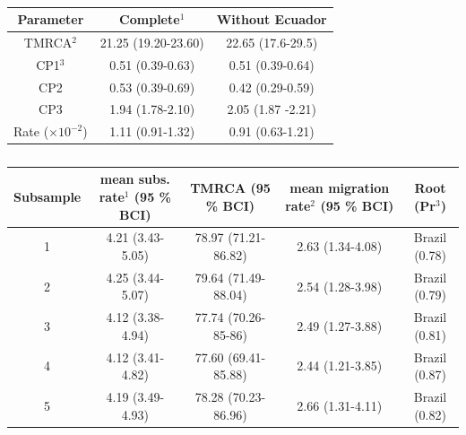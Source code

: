 \documentclass[a4paper,10pt]{article}
\begin{document}
\begin{center}
\begin{table}[h]
\caption{}
\begin{tabular}{ccc}
\toprule
Parameter	&Complete$^{1}$	&Without Ecuador\\
\midrule
TMRCA$^{2}$	&21.25 (19.20-23.60)	&22.65 (17.6-29.5)\\
CP1$^{3}$	&0.51 (0.39-0.63)	&0.51 (0.39-0.64)\\
CP2	&0.53 (0.39-0.69)	&0.42 (0.29-0.59)\\
CP3	&1.94 (1.78-2.10)	& 2.05 (1.87 -2.21)\\
Rate ($\times 10^{-2}$)	&1.11 (0.91-1.32)	&0.91 (0.63-1.21)\\
\bottomrule
\end{tabular}
\label{tab:SB_O}
 \end{table}
\end{center}

\newpage
\begin{table}
\medskip
\begin{minipage}{\textwidth} 
\begin{center}
\caption{}
\begin{tabular}{ccccc}
\toprule
Subsample	&mean subs. rate$^{1}$ (95 \% BCI)	&TMRCA (95 \% BCI)	&mean migration rate$^{2}$  (95 \% BCI)	&Root (Pr$^{3}$)\\
\midrule
1	&4.21 (3.43-5.05)	&78.97 (71.21-86.82)	&2.63 (1.34-4.08)	&Brazil (0.78)\\
2	&4.25 (3.44-5.07)	&79.64 (71.49-88.04)	&2.54 (1.28-3.98)	&Brazil (0.79)\\
3	&4.12 (3.38-4.94)	&77.74 (70.26-85-86)	&2.49 (1.27-3.88)	&Brazil (0.81)\\
4	&4.12 (3.41-4.82)	&77.60 (69.41-85.88)	&2.44 (1.21-3.85)	&Brazil (0.87)\\
5	&4.19 (3.49-4.93)	&78.28 (70.23-86.96)	&2.66 (1.31-4.11)	&Brazil (0.82)\\
\bottomrule
\end{tabular}
\label{tab:ED_A}
\end{center}
\end{minipage}
\end{table}
\end{document}
